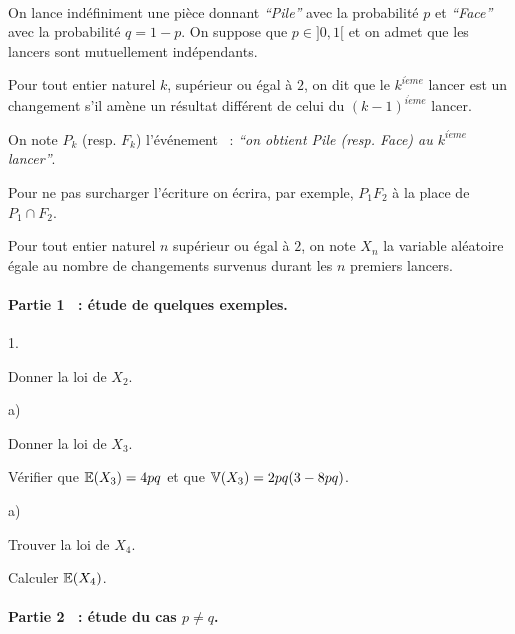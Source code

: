 \documentclass[11pt]{article}%
\begin{document}
\hfill\\

On lance indéfiniment une pièce donnant \textit{``Pile''} avec la
probabilité $p$ et \textit{``Face''} avec la probabilité $q = 1-p$. On
suppose que $p\in]0,1[$ et on admet que les lancers sont mutuellement
indépendants.

Pour tout entier naturel $k$, supérieur ou égal à $2$, on dit que le
$k^{i\grave{e}me}$ lancer est un changement s'il amène un résultat
différent de celui du $(k-1)^{i\grave{e}me}$ lancer.

On note $P_{k}$ (resp. $F_{k}$) l'événement~ : \textit{``on obtient
Pile
(resp. Face) au $k^{i\grave{e}me}$ lancer''}.

Pour ne pas surcharger l'écriture on écrira, par exemple, $P_{1}F_{2}$
à
la place de $P_{1}\cap F_{2}$.

Pour tout entier naturel $n$ supérieur ou égal à $2$, on note $X_{n}$
la
variable aléatoire égale au nombre de changements survenus durant les
$n$
premiers lancers.

\paragraph{Partie 1~ : étude de quelques exemples.}

\begin{noliste}{1.}
 \setlength{\itemsep}{4mm}
\item Donner la loi de $X_{2}$.

\item 
\begin{noliste}{a)}
 \setlength{\itemsep}{2mm}
\item Donner la loi de $X_{3}$.

\item Vérifier que $\mathbb{E}(X_{3}) = 4pq$ et que $\mathbb{V}(X_{3}) = 2pq(3-8pq)$.
\end{noliste}

\item 
\begin{noliste}{a)}
 \setlength{\itemsep}{2mm}
\item Trouver la loi de $X_{4}$.

\item Calculer $\mathbb{E}(X_{4})$.
\end{noliste}
\end{noliste}

\paragraph{Partie 2~ : étude du cas $p\neq q$.}
\end{document}
